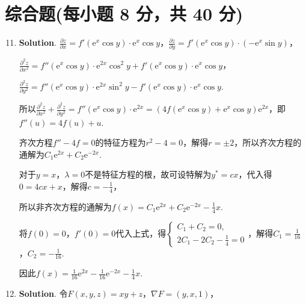 \documentclass[../Main.tex]{subfiles}
\begin{document}
\section{综合题(每小题 8 分，共 40 分)}
\begin{enumerate}
    \setcounter{enumi}{10}
    \item \textbf{Solution}. $\frac{\partial z}{\partial x}= f'\left(\mathrm{e}
              ^{x}\cos y\right)\cdot \mathrm{e}^{x}\cos y$，$\frac{\partial z}{\partial
                  y}= f'\left(\mathrm{e}^{x}\cos y\right)\cdot \left(-\mathrm{e}^{x}\sin y\right
              )$，

          $\frac{\partial^{2} z}{\partial x^{2}}= f''\left(\mathrm{e}^{x}\cos y\right
              )\cdot \mathrm{e}^{2x}\cos^{2} y + f'\left(\mathrm{e}^{x}\cos y\right)\cdot
              \mathrm{e}^{x}\cos y$，

          $\frac{\partial^{2} z}{\partial y^{2}}= f''\left(\mathrm{e}^{x}\cos y\right
              )\cdot \mathrm{e}^{2x}\sin^{2} y - f'\left(\mathrm{e}^{x}\cos y\right)\cdot
              \mathrm{e}^{x}\cos y$.

          所以$\frac{\partial^{2} z}{\partial x^{2}}+\frac{\partial^{2} z}{\partial
                  y^{2}}= f''\left(\mathrm{e}^{x}\cos y\right)\cdot \mathrm{e}^{2x}= \left(4f
              \left(\mathrm{e}^{x}\cos y\right)+\mathrm{e}^{x}\cos y\right)\mathrm{e}^{2x}$，即$f
              ''(u) = 4f(u)+u$.

          齐次方程$f''-4f=0$的特征方程为$r^{2}-4=0$，解得$r=\pm 2$，所以齐次方程的通解为$C
                  _{1}\mathrm{e}^{2x}+C_{2}\mathrm{e}^{-2x}$.

          对于$y=x$，$\lambda = 0$不是特征方程的根，故可设特解为$y^{*}=cx$，代入得$0 =
              4cx + x$，解得$c=-\frac{1}{4}$，

          所以非齐次方程的通解为$f(x) = C_{1}\mathrm{e}^{2x}+C_{2}\mathrm{e}^{-2x}-\frac{1}{4}
              x$.

          将$f(0)=0$，$f'(0)=0$代入上式，得$\begin{cases}
                  C_{1}+C_{2}=0, \\
                  2C_{1}-2C_{2}-\frac{1}{4}=0
              \end{cases}$，解得$C_{1}=\frac{1}{16}$，$C_{2}=-\frac{1}{16}$.

          因此$f(x) = \frac{1}{16}\mathrm{e}^{2x}-\frac{1}{16}\mathrm{e}^{-2x}-\frac{1}{4}
              x$.

    \item \textbf{Solution}. 令$F(x,y,z) = xy+z$，$\nabla F = (y,x,1)$，


\end{enumerate}
\end{document}
